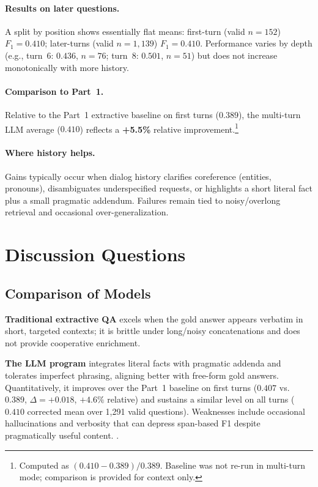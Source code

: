 \documentclass[12pt, letterpaper]{article}
\begin{document}
\paragraph{Results on later questions.}
A split by position shows essentially flat means: first-turn (valid $n{=}152$) $F_1{=}0.410$; later-turns (valid $n{=}1{,}139$) $F_1{=}0.410$. Performance varies by depth (e.g., turn~6: $0.436$, $n{=}76$; turn~8: $0.501$, $n{=}51$) but does not increase monotonically with more history.

\paragraph{Comparison to Part~1.}
Relative to the Part~1 extractive baseline on first turns ($0.389$), the multi-turn LLM average ($0.410$) reflects a \textbf{+5.5\%} relative improvement.\footnote{Computed as $(0.410{-}0.389)/0.389$. Baseline was not re-run in multi-turn mode; comparison is provided for context only.}

\paragraph{Where history helps.}
Gains typically occur when dialog history clarifies coreference (entities, pronouns), disambiguates underspecified requests, or highlights a short literal fact plus a small pragmatic addendum. Failures remain tied to noisy/overlong retrieval and occasional over-generalization.


\clearpage
{}
\section*{Discussion Questions}
\label{part3}
\subsection*{Comparison of Models}
{}
\textbf{Traditional extractive QA} excels when the gold answer appears verbatim in short, targeted contexts; it is brittle under long/noisy concatenations and does not provide cooperative enrichment. 

\textbf{The LLM program} integrates literal facts with pragmatic addenda and tolerates imperfect phrasing, aligning better with free-form gold answers. Quantitatively, it improves over the Part~1 baseline on first turns (\(0.407\) vs.\ \(0.389\), \(\Delta{=}{+}0.018\), \(+4.6\%\) relative) and sustains a similar level on all turns (\(0.410\) corrected mean over 1{,}291 valid questions). Weaknesses include occasional hallucinations and verbosity that can depress span-based F1 despite pragmatically useful content.
\citep{pragmaticqa2023}.
\end{document}
